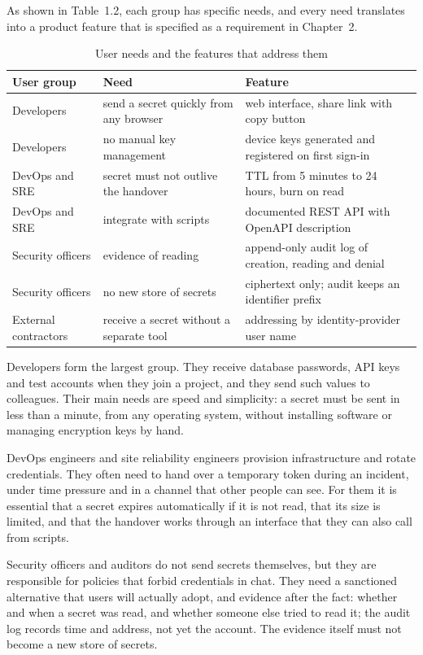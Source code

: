 \documentclass[12pt,a4paper]{article}
\numberwithin{equation}{section}
\numberwithin{figure}{section}
\numberwithin{table}{section}
\newcommand{\tablesetup}{\fontsize{11pt}{13pt}\selectfont\singlespacing\renewcommand{\arraystretch}{1.15}}
\newcommand{\leadin}[1]{%
  {\onehalfspacing\setlength{\parindent}{1.25cm}\indent #1\par}\vspace{8pt}}
\begin{document}
\begin{table}[H]
\leadin{As shown in Table~1.2, each group has specific needs, and every need translates into a product feature that is specified as a requirement in Chapter~2.}
\tablesetup
\caption{User needs and the features that address them}
\label{tab:needs}
\begin{tabularx}{\textwidth}{|P{0.24\textwidth}|L|P{0.30\textwidth}|}
\hline
\textbf{User group} & \textbf{Need} & \textbf{Feature} \\ \hline
Developers & send a secret quickly from any browser & web interface, share link with copy button \\ \hline
Developers & no manual key management & device keys generated and registered on first sign-in \\ \hline
DevOps and SRE & secret must not outlive the handover & TTL from 5 minutes to 24 hours, burn on read \\ \hline
DevOps and SRE & integrate with scripts & documented REST API with OpenAPI description \\ \hline
Security officers & evidence of reading & append-only audit log of creation, reading and denial \\ \hline
Security officers & no new store of secrets & ciphertext only; audit keeps an identifier prefix \\ \hline
External contractors & receive a secret without a separate tool & addressing by identity-provider user name \\ \hline
\end{tabularx}
\end{table}

Developers form the largest group. They receive database passwords, API keys and test accounts when they join a project, and they send such values to colleagues. Their main needs are speed and simplicity: a secret must be sent in less than a minute, from any operating system, without installing software or managing encryption keys by hand.

DevOps engineers and site reliability engineers provision infrastructure and rotate credentials. They often need to hand over a temporary token during an incident, under time pressure and in a channel that other people can see. For them it is essential that a secret expires automatically if it is not read, that its size is limited, and that the handover works through an interface that they can also call from scripts.

Security officers and auditors do not send secrets themselves, but they are responsible for policies that forbid credentials in chat. They need a sanctioned alternative that users will actually adopt, and evidence after the fact: whether and when a secret was read, and whether someone else tried to read it; the audit log records time and address, not yet the account. The evidence itself must not become a new store of secrets.
\end{document}
